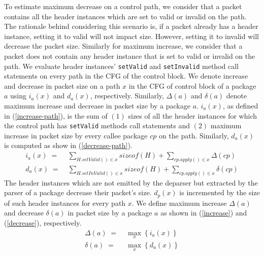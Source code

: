 \documentclass[letterpaper,twocolumn,10pt]{article}
\begin{document}
To estimate maximum decrease on a control path, we consider that a packet contains all the header instances which are set to valid or invalid on the path.
The rationale behind considering this scenario is, if a packet already has a header instance, setting it to valid will not impact size. However, setting it to invalid will decrease the packet size.
Similarly for maximum increase, we consider that a packet does not contain any header instance that is set to valid or invalid on the path. 
We evaluate header instances' \texttt{setValid} and \texttt{setInvalid} method call statements on every path in the CFG of the control block.
We denote increase and decrease in packet size on a path $x$ in the CFG of control block of a package $a$ using $i_{a}(x)$ and $d_{a}(x)$, respectively.
Similarly, $\Delta(a)$ and $\delta(a)$ denote maximum increase and decrease in packet size by a package $a$.
$i_{a}(x)$, as defined in (\ref{increase-path}), is the sum of $(1)$ sizes of all the header instances for which the control path has \texttt{setValid} methods call statements and $(2)$ maximum increase in packet size by every callee package $cp$ on the path.
Similarly, $d_{a}(x)$ is computed as show in (\ref{decrease-path}).
\begin{align}
i_{a}(x)\; =& \; \sum_{H.setValid() \in x} sizeof(H) + \sum_{cp.apply()\in x} \Delta(cp) \label{increase-path} \\
d_{a}(x)\; =& \; \sum_{H.setInValid() \in x} sizeof(H) + \sum_{cp.apply()\in x} \delta(cp) \label{decrease-path}
\end{align}
The header instances which are not emitted by the deparser but extracted by the parser of a package decrease their packet's size. 
$d_{p}(x)$ is incremented by the size of such header instances for every path $x$.
We define maximum increase $\Delta(a)$ and decrease $\delta(a)$ in packet size by a package $a$ as shown in (\ref{increase}) and (\ref{decrease}), respectively.
\begin{align}
\Delta(a)\; =& \; \max_{x} \left\{ i_{a}(x) \right\} \label{increase} \\
\delta(a)\; =& \; \max_{x} \left\{ d_{a}(x) \right\} \label{decrease}
\end{align}

\end{document}
